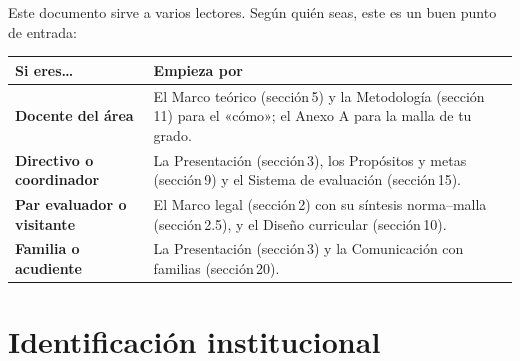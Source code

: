 \documentclass[12pt, a4paper]{article}
\begin{document}
\vspace{0.4cm}
\noindent Este documento sirve a varios lectores. Según quién seas, este es un
buen punto de entrada:

\medskip
\begin{center}
\begin{tabular}{|L{4cm}|L{10cm}|}
\hline
{}
\color{white}\textbf{Si eres\ldots} & \color{white}\textbf{Empieza por} \\
\hline
\textbf{Docente del área} & El Marco teórico (sección\,5) y la Metodología (sección\,11) para el «cómo»; el Anexo A para la malla de tu grado. \\
\hline
\textbf{Directivo o coordinador} & La Presentación (sección\,3), los Propósitos y metas (sección\,9) y el Sistema de evaluación (sección\,15). \\
\hline
\textbf{Par evaluador o visitante} & El Marco legal (sección\,2) con su síntesis norma–malla (sección\,2.5), y el Diseño curricular (sección\,10). \\
\hline
\textbf{Familia o acudiente} & La Presentación (sección\,3) y la Comunicación con familias (sección\,20). \\
\hline
\end{tabular}
\end{center}
\newpage


\section{Identificación institucional}
\end{document}
